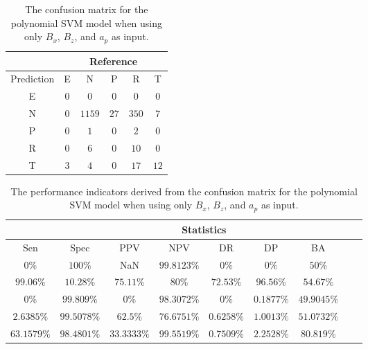 \begin{table}[!ht]
	\centering
	\begin{tabular}{|c|c|c|c|c|c|}
		\hline
		 & \multicolumn{5}{|c|}{Reference} \\ \hline
		 Prediction & E & N & P & R & T \\ \hline
		 E & $0$ & $0$ & $0$ & $0$ & $0$ \\ \hline
		 N & $0$ & $1159$ & $27$ & $350$ & $7$ \\ \hline
		 P & $0$ & $1$ & $0$ & $2$ & $0$ \\ \hline
		 R & $0$ & $6$ & $0$ & $10$ & $0$ \\ \hline
		 T & $3$ & $4$ & $0$ & $17$ & $12$ \\ \hline
	\end{tabular}
	\caption{The confusion matrix for the polynomial SVM model when using only $B_{x}$, $B_{z}$, and $a_{p}$ as input.}
	\label{tab:cm:xzap:svmPoly}
\end{table}

\begin{table}[!ht]
	\centering
	\begin{tabular}{|c|c|c|c|c|c|c|c|c|}
		\hline
		 & \multicolumn{7}{c|}{Statistics} \\ \hline
		Sen & Spec & PPV & NPV & DR & DP & BA \\ \hline
		$0\%$ & $100\%$ & NaN & $99.8123\%$ & $0\%$ & $0\%$ & $50\%$ \\ \hline
		$99.06\%$ & $10.28\%$ & $75.11\%$ & $80\%$ & $72.53\%$ & $96.56\%$ & $54.67\%$ \\ \hline
		$0\%$ & $99.809\%$ & $0\%$ & $98.3072\%$ & $0\%$ & $0.1877\%$ & $49.9045\%$ \\ \hline
		$2.6385\%$ & $99.5078\%$ & $62.5\%$ & $76.6751\%$ & $0.6258\%$ & $1.0013\%$ & $51.0732\%$ \\ \hline
		$63.1579\%$ & $98.4801\%$ & $33.3333\%$ & $99.5519\%$ & $0.7509\%$ & $2.2528\%$ & $80.819\%$ \\ \hline
	\end{tabular}
	\caption{The performance indicators derived from the confusion matrix for the polynomial SVM model when using only $B_{x}$, $B_{z}$, and $a_{p}$ as input.}
	\label{tab:cs:xzap:svmPoly}
\end{table}

